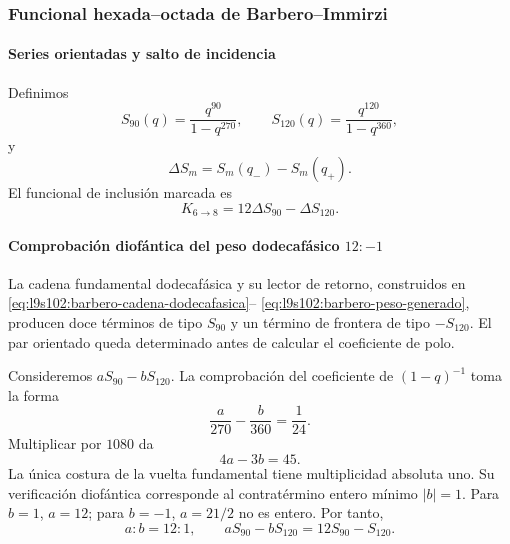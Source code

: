 \subsubsection{Funcional hexada--octada de Barbero--Immirzi}

\paragraph{Series orientadas y salto de incidencia}

Definimos
\begin{equation}
S_{90}(q)=\frac{q^{90}}{1-q^{270}},
\qquad
S_{120}(q)=\frac{q^{120}}{1-q^{360}},
\label{eq:barbero-series}
\end{equation}
y
\[
\Delta S_m=S_m(q_-)-S_m(q_+).
\]
El funcional de inclusión marcada es
\begin{equation}
K_{6\to8}=12\Delta S_{90}-\Delta S_{120}.
\label{eq:barbero-núcleo}
\end{equation}

\paragraph{Comprobación diofántica del peso dodecafásico \(12:-1\)}

La cadena fundamental dodecafásica y su lector de retorno, construidos en
\eqref{eq:l9s102:barbero-cadena-dodecafasica}--%
\eqref{eq:l9s102:barbero-peso-generado}, producen doce términos de tipo
\(S_{90}\) y un término de frontera de tipo \(-S_{120}\). El par orientado
queda determinado antes de calcular el coeficiente de polo.

Consideremos \(aS_{90}-bS_{120}\). La comprobación del coeficiente de
\((1-q)^{-1}\) toma la forma
\begin{equation}
\frac{a}{270}-\frac{b}{360}=\frac1{24}.
\label{eq:pole-condition}
\end{equation}
Multiplicar por \(1080\) da
\[
4a-3b=45.
\]
La única costura de la vuelta fundamental tiene multiplicidad absoluta uno.
Su verificación diofántica corresponde al contratérmino entero mínimo
\(|b|=1\). Para \(b=1\), \(a=12\); para \(b=-1\), \(a=21/2\) no es entero.
Por tanto,
\begin{equation}
\boxed{a:b=12:1,\qquad aS_{90}-bS_{120}=12S_{90}-S_{120}.}
\label{eq:12minus1}
\end{equation}

